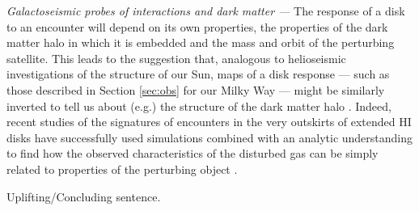\documentclass[galaxies,article,submit,moreauthors,pdftex,10pt,a4paper]{mdpi}
\begin{document}
\begin{description}
\item{\it Galactoseismic probes of interactions and dark matter ---}
The response of a disk to an encounter will depend on its own properties, the properties of the dark matter halo in which it is embedded and the mass and orbit of the perturbing satellite.
This leads to the suggestion that, analogous to helioseismic investigations of the structure of our Sun, maps of a disk response --- such as those described in Section \ref{sec:obs} for our Milky Way --- might be similarly inverted to tell us about (e.g.) the structure of the dark matter halo
\cite{widrow12}.
Indeed, recent studies of the signatures of encounters in the very outskirts of extended HI disks have successfully used simulations combined with an analytic understanding to find how the observed characteristics of the disturbed gas can be simply related to properties of the perturbing object \cite{chakrabarti09,chakrabarti11b,chang11}.
\end{description}

Uplifting/Concluding sentence.

\vspace{6pt}






\end{document}
